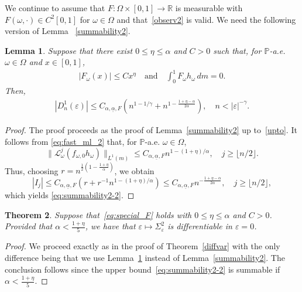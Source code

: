 \documentclass[12pt,reqno,a4paper]{article}
\newcommand\bP{{\mathbb P}}
\newtheorem{theorem}{Theorem}
\newtheorem{lemma}[theorem]{Lemma}
\begin{document}
We continue to assume that $F\colon \Omega \times [0, 1]\to \mathbb R$ is measurable with $F(\omega, \cdot)\in C^2[0, 1]$ for $\omega \in \Omega$ and that~\eqref{observ2} is valid. We need the following
version of Lemma ~\ref{summability2}.

\begin{lemma}\label{improvedsum}
	Suppose that there exist $0 \le \eta \le \alpha$ and $C>0$ such that, for 
	$\bP$-a.e. $\omega \in \Omega$ and $x \in [0,1]$,
	\begin{align}\label{eq:special_F}
		|F_\omega(x)| \le C x^\eta \quad \text{and} \quad 
		\int_0^1 F_\omega h_\omega \, d m = 0.
	\end{align}
	Then,
	\begin{align}\label{eq:summability2-2}
		|D_n^1(\varepsilon)| \le C_{\alpha, \underline{\alpha}, F}(n^{ 1 - 1 / \gamma }+ 
		n^{ 1 - \frac{1 + \eta - \alpha }{ 2 \alpha } } ), \quad n<|\varepsilon|^{-\gamma}.
	\end{align}
\end{lemma}

\begin{proof}
	The proof proceeds as the proof of Lemma~\ref{summability2} up to~\eqref{upto}. It follows from \eqref{eq:fast_ml_2} that, for $\bP$-a.e. $\omega \in \Omega$,\
	$$ 
	\|\mathcal L_\omega^j (f_{\omega, 0}h_\omega)\|_{L^1(m)} \le   C_{\alpha, \underline{\alpha}, F} n^{ 1 - (1 + \eta)/\alpha}, \quad  j\ge \lfloor n/2\rfloor.
	$$
	Thus, choosing $r = n^{ \frac12 (  1 - \frac{1 + \eta }{\alpha} )  }$, we obtain 
	$$
	|I_j| \le C_{\alpha, \underline{\alpha}, F}(r+r^{-1}n^{ 1 - (1 + \eta)/\alpha }) \le 
	C_{\alpha, \underline{\alpha}, F} n^{ - \frac{1 + \eta - \alpha }{ 2 \alpha } }
	, \quad  j\ge \lfloor n/2\rfloor,
	$$	
	which yields \eqref{eq:summability2-2}.
	
\end{proof}

\begin{theorem}\label{thm:special}
	Suppose that~\eqref{eq:special_F} holds with $0\le \eta \le \alpha$ and $C>0$. Provided that $\alpha<\frac{1+\eta}{5}$, we have that $\varepsilon \mapsto \Sigma_\varepsilon^2$ is differentiable in $\varepsilon=0$.
\end{theorem}

\begin{proof}
	We proceed exactly as in the proof of Theorem~\ref{diffvar} with the only difference being that we use Lemma~\ref{improvedsum} instead of Lemma~\ref{summability2}. The conclusion follows since the upper bound~\eqref{eq:summability2-2} is summable if \(\alpha < \frac{1 + \eta}{5}\).
\end{proof}
\end{document}
